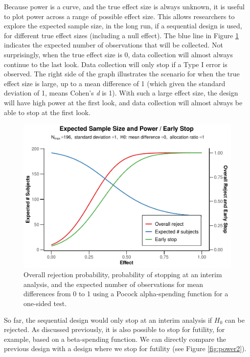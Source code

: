 \documentclass[
  english,
  ,jou, a4paper,floatsintext]{apa6}
\begin{document}
Because power is a curve, and the true effect size is always unknown, it is useful to plot power across a range of possible effect size. This allows researchers to explore the expected sample size, in the long run, if a sequential design is used, for different true effect sizes (including a null effect). The blue line in Figure \ref{fig:power1} indicates the expected number of observations that will be collected. Not surprisingly, when the true effect size is 0, data collection will almost always continue to the last look. Data collection will only stop if a Type I error is observed. The right side of the graph illustrates the scenario for when the true effect size is large, up to a mean difference of 1 (which given the standard deviation of 1, means Cohen's \emph{d} is 1). With such a large effect size, the design will have high power at the first look, and data collection will almost always be able to stop at the first look.

\begin{figure}
\centering
\includegraphics{sequential_tutorial_files/figure-latex/power1-1.pdf}
\caption{\label{fig:power1}Overall rejection probability, probability of stopping at an interim analysis, and the expected number of observations for mean differences from 0 to 1 using a Pocock alpha-spending function for a one-sided test.}
\end{figure}

So far, the sequential design would only stop at an interim analysis if \(H_0\) can be rejected. As discussed previously, it is also possible to stop for futility, for example, based on a beta-spending function. We can directly compare the previous design with a design where we stop for futility (see Figure \ref{fig:power2}).
\end{document}
